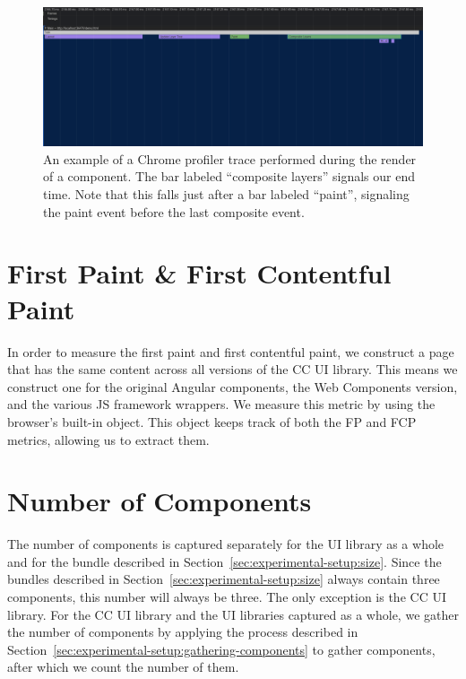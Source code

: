 \begin{figure}[h]
  \includegraphics[width=\columnwidth]{figures/experimental-setup/render-time-zoomed.png}
  \caption{An example of a Chrome profiler trace performed during the render of a component. The bar labeled ``composite layers'' signals our end time. Note that this falls just after a bar labeled ``paint'', signaling the paint event before the last composite event.}
  \label{fig:experimental-setup:render-time-end}
  \centering
\end{figure}

\section{First Paint \& First Contentful Paint}
In order to measure the first paint and first contentful paint, we construct a page that has the same content across all versions of the CC UI library. This means we construct one for the original Angular components, the Web Components version, and the various JS framework wrappers. We measure this metric by using the browser's built-in  object. This object keeps track of both the FP and FCP metrics, allowing us to extract them.

\section{Number of Components}
The number of components is captured separately for the UI library as a whole and for the bundle described in Section~\ref{sec:experimental-setup:size}. Since the bundles described in Section~\ref{sec:experimental-setup:size} always contain three components, this number will always be three. The only exception is the CC UI library. For the CC UI library and the UI libraries captured as a whole, we gather the number of components by applying the process described in Section~\ref{sec:experimental-setup:gathering-components} to gather components, after which we count the number of them.
